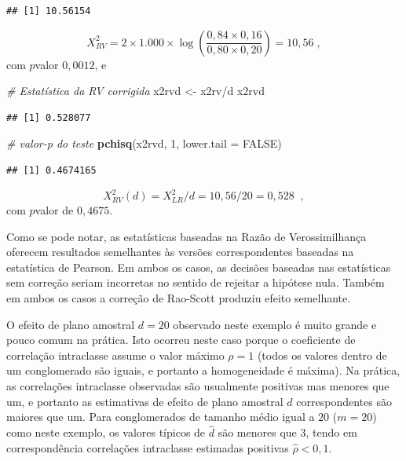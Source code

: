 \documentclass[]{book}
\newenvironment{Shaded}{\begin{snugshade}}{\end{snugshade}}
\newcommand{\KeywordTok}[1]{\textcolor[rgb]{0.13,0.29,0.53}{\textbf{{#1}}}}
\newcommand{\DataTypeTok}[1]{\textcolor[rgb]{0.13,0.29,0.53}{{#1}}}
\newcommand{\DecValTok}[1]{\textcolor[rgb]{0.00,0.00,0.81}{{#1}}}
\newcommand{\StringTok}[1]{\textcolor[rgb]{0.31,0.60,0.02}{{#1}}}
\newcommand{\CommentTok}[1]{\textcolor[rgb]{0.56,0.35,0.01}{\textit{{#1}}}}
\newcommand{\OtherTok}[1]{\textcolor[rgb]{0.56,0.35,0.01}{{#1}}}
\newcommand{\NormalTok}[1]{{#1}}
\numberwithin{example}{chapter}
\numberwithin{remark}{chapter}
\numberwithin{definition}{chapter}
\begin{document}
\begin{verbatim}
## [1] 10.56154
\end{verbatim}

\[
X_{RV}^{2}=2\times 1.000\times \log \left( \frac{0,84\times 0,16}{0,80\times
0,20}\right) =10,56\;, 
\] com \(p\)valor \(0,0012\), e

\begin{Shaded}
\begin{Highlighting}[]
\CommentTok{# Estatística da RV corrigida}
\NormalTok{x2rvd <-}\StringTok{ }\NormalTok{x2rv/d}
\NormalTok{x2rvd}
\end{Highlighting}
\end{Shaded}

\begin{verbatim}
## [1] 0.528077
\end{verbatim}

\begin{Shaded}
\begin{Highlighting}[]
\CommentTok{# valor-p do teste}
\KeywordTok{pchisq}\NormalTok{(x2rvd, }\DecValTok{1}\NormalTok{, }\DataTypeTok{lower.tail =} \OtherTok{FALSE}\NormalTok{)}
\end{Highlighting}
\end{Shaded}

\begin{verbatim}
## [1] 0.4674165
\end{verbatim}

\[
X_{RV}^{2}(d)=X_{LR}^{2}/d=10,56/20=0,528\;\;, 
\] com \(p\)valor de \(0,4675\).

Como se pode notar, as estatísticas baseadas na Razão de Verossimilhança
oferecem resultados semelhantes às versões correspondentes baseadas na
estatística de Pearson. Em ambos os casos, as decisões baseadas nas
estatísticas sem correção seriam incorretas no sentido de rejeitar a
hipótese nula. Também em ambos os casos a correção de Rao-Scott produziu
efeito semelhante.

O efeito de plano amostral \(d=20\) observado neste exemplo é muito
grande e pouco comum na prática. Isto ocorreu neste caso porque o
coeficiente de correlação intraclasse assume o valor máximo \(\rho =1\)
(todos os valores dentro de um conglomerado são iguais, e portanto a
homogeneidade é máxima). Na prática, as correlações intraclasse
observadas são usualmente positivas mas menores que um, e portanto as
estimativas de efeito de plano amostral \(\widehat{d}\) correspondentes
são maiores que um. Para conglomerados de tamanho médio igual a \(20\)
(\(m=20\)) como neste exemplo, os valores típicos de \(\widehat{d}\) são
menores que \(3\), tendo em correspondência correlações intraclasse
estimadas positivas \(\widehat{\rho }<0,1\).
\end{document}
